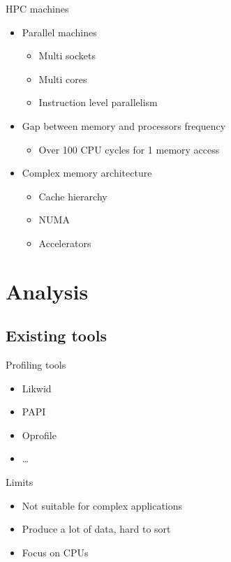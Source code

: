 \documentclass[xcolor={usenames,dvipsnames}]{beamer}
\newcommand{\sectiontitle}{}
\newcommand{\newsection}[1]{\renewcommand{\sectiontitle}{#1}\section{#1}}
\newcommand{\subsectiontitle}{}
\newcommand{\newsubsection}[1]{\renewcommand{\subsectiontitle}{#1}\subsection{#1}}
\begin{document}
\begin{frame}{HPC machines}
    \begin{itemize}
        \item<1-> Parallel machines
            \begin{itemize}
                \item Multi sockets
                \item Multi cores
                \item Instruction level parallelism
            \end{itemize}
        \item<2-> Gap between memory and processors frequency
            \begin{itemize}
                \item Over 100 CPU cycles for 1 memory access
            \end{itemize}
        \item<3-> Complex memory architecture
            \begin{itemize}
                \item Cache hierarchy
                \item NUMA
                \item Accelerators
            \end{itemize}
    \end{itemize}
\end{frame}

\newsection{Analysis}

\newsubsection{Existing tools}

\begin{frame}{Profiling tools}
    \begin{itemize}
        \item Likwid\cite{Treibig10LIKWID}
        \item PAPI \cite{Weaver13PAPI}
        \item Oprofile \cite{Oprofile}
        \item \dots
    \end{itemize}
    \pause
    \begin{alertblock}{Limits}
        \begin{itemize}
            \item Not suitable for complex applications
            \item Produce a lot of data, hard to sort
            \item Focus on CPUs
        \end{itemize}
    \end{alertblock}
\end{frame}
\end{document}
